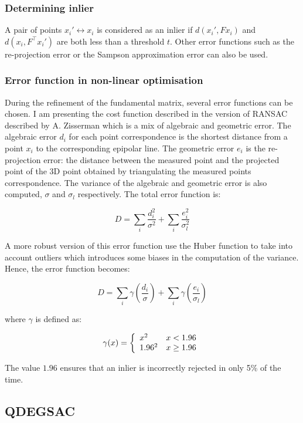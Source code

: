 \documentclass[11pt]{report}
\begin{document}
\subsubsection{Determining inlier}

A pair of points $x_i' \leftrightarrow x_i$ is considered as an inlier if $d(x_i', Fx_i)$ and  $d(x_i, F^\top x_i')$ are both less than a threshold $t$. Other error functions such as the re-projection error or the Sampson approximation error can also be used.

\subsubsection{Error function in non-linear optimisation}

During the refinement of the fundamental matrix, several error functions can be chosen. I am presenting the cost function described in the version of RANSAC described by A. Zisserman\cite{Ransac97} which is a mix of algebraic and geometric error. The algebraic error $d_i$ for each point correspondence is the shortest distance from a point $x_i$ to the corresponding epipolar line. The geometric error $e_i$ is the re-projection error: the distance between the measured point and the projected point of the 3D point obtained by triangulating the measured points correspondence. The variance of the algebraic and geometric error is also computed, $\sigma$ and $\sigma_l$ respectively. The total error function is:

\[
    D = \sum_i \frac{d_i^2}{\sigma^2} + \sum_i \frac{e_i^2}{\sigma_l^2}
\]

A more robust version of this error function use the Huber function to take into account outliers which introduces some biases in the computation of the variance. Hence, the error function becomes:

\[
    D = \sum_i \gamma(\frac{d_i}{\sigma}) + \sum_i \gamma(\frac{e_i}{\sigma_l})
\]

where $\gamma$ is defined as:

\[
    \gamma(x) = 
\left \{
  \begin{array}{l l}
        x^2 & x < 1.96 \\
        1.96^2 & x \geq 1.96 \\
  \end{array}
\right.
\] 

The value $1.96$ ensures that an inlier is incorrectly rejected in only 5\% of the time.

\subsection{QDEGSAC}
\end{document}
